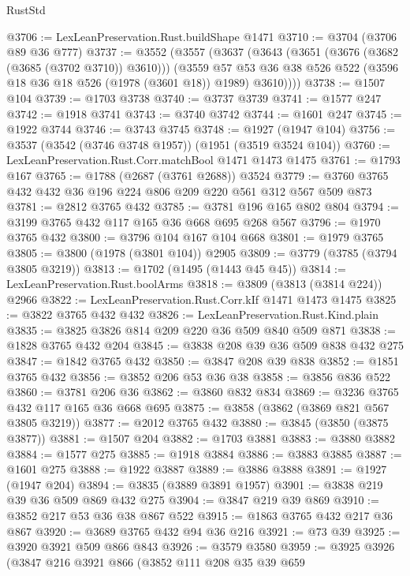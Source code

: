\begin{lexlean}{RustStd}
\begin{coremodule}
@3706 := LexLeanPreservation.Rust.buildShape @1471
@3710 := @3704 (@3706 @89 @36 @777)
@3737 := @3552
    (@3557
      (@3637
        (@3643
          (@3651 (@3676 (@3682 (@3685 (@3702 @3710)) @3610)))
          (@3559
            @57
            @53
            @36
            @38
            @526
            @522
            (@3596 @18 @36 @18 @526 (@1978 (@3601 @18)) @1989)
            @3610))))
@3738 := @1507 @104
@3739 := @1703 @3738
@3740 := @3737 @3739
@3741 := @1577 @247
@3742 := @1918 @3741
@3743 := @3740 @3742
@3744 := @1601 @247
@3745 := @1922 @3744
@3746 := @3743 @3745
@3748 := @1927 (@1947 @104)
@3756 := @3537 (@3542 (@3746 @3748 @1957)) (@1951 (@3519 @3524 @104))
@3760 := LexLeanPreservation.Rust.Corr.matchBool @1471 @1473 @1475
@3761 := @1793 @167
@3765 := @1788 (@2687 (@3761 @2688)) @3524
@3779 := @3760 @3765 @432 @432 @36 @196 @224 @806 @209 @220 @561 @312 @567 @509 @873
@3781 := @2812 @3765 @432
@3785 := @3781 @196 @165 @802 @804
@3794 := @3199 @3765 @432 @117 @165 @36 @668 @695 @268 @567
@3796 := @1970 @3765 @432
@3800 := @3796 @104 @167 @104 @668
@3801 := @1979 @3765
@3805 := @3800 (@1978 (@3801 @104)) @2905
@3809 := @3779 (@3785 (@3794 @3805 @3219))
@3813 := @1702 (@1495 (@1443 @45 @45))
@3814 := LexLeanPreservation.Rust.boolArms
@3818 := @3809 (@3813 (@3814 @224)) @2966
@3822 := LexLeanPreservation.Rust.Corr.kIf @1471 @1473 @1475
@3825 := @3822 @3765 @432 @432
@3826 := LexLeanPreservation.Rust.Kind.plain
@3835 := @3825 @3826 @814 @209 @220 @36 @509 @840 @509 @871
@3838 := @1828 @3765 @432 @204
@3845 := @3838 @208 @39 @36 @509 @838 @432 @275
@3847 := @1842 @3765 @432
@3850 := @3847 @208 @39 @838
@3852 := @1851 @3765 @432
@3856 := @3852 @206 @53 @36 @38
@3858 := @3856 @836 @522
@3860 := @3781 @206 @36
@3862 := @3860 @832 @834
@3869 := @3236 @3765 @432 @117 @165 @36 @668 @695
@3875 := @3858 (@3862 (@3869 @821 @567 @3805 @3219))
@3877 := @2012 @3765 @432
@3880 := @3845 (@3850 (@3875 @3877))
@3881 := @1507 @204
@3882 := @1703 @3881
@3883 := @3880 @3882
@3884 := @1577 @275
@3885 := @1918 @3884
@3886 := @3883 @3885
@3887 := @1601 @275
@3888 := @1922 @3887
@3889 := @3886 @3888
@3891 := @1927 (@1947 @204)
@3894 := @3835 (@3889 @3891 @1957)
@3901 := @3838 @219 @39 @36 @509 @869 @432 @275
@3904 := @3847 @219 @39 @869
@3910 := @3852 @217 @53 @36 @38 @867 @522
@3915 := @1863 @3765 @432 @217 @36 @867
@3920 := @3689 @3765 @432 @94 @36 @216
@3921 := @73 @39
@3925 := @3920 @3921 @509 @866 @843
@3926 := @3579 @3580
@3959 := @3925
    @3926
    (@3847
      @216
      @3921
      @866
      (@3852
        @111
        @208
        @35
        @39
        @659

\end{coremodule}
\end{lexlean}
